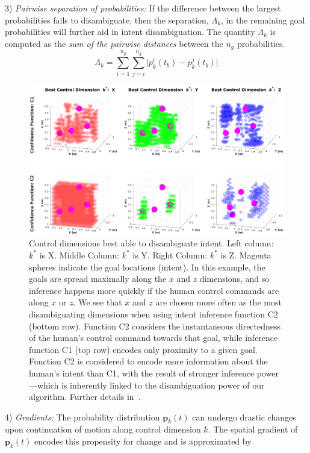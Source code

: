 3) \textit{Pairwise separation of probabilities:} If the difference between the largest probabilities fails to disambiguate, then the separation, $\Lambda_k$, in the remaining goal probabilities will further aid in intent disambiguation. The quantity $\Lambda_k$ is computed as the \textit{sum of the pairwise distances} between the $n_g$ probabilities.
\begin{equation}
\Lambda_k = \sum_{i=1}^{n_g}\sum_{j=i}^{n_g}\lvert p^i_k(t_b) - p^j_k(t_b)\rvert
\end{equation}
\begin{figure}[t]
	\centering
	\includegraphics[width = 1.15\hsize, height = 0.45\vsize, center]{./finalfigures/Fig4.eps}
	\caption{Control dimensions best able to disambiguate intent.  Left column: $k^*$ is X. Middle Column: $k^*$ is Y. Right Column: $k^*$ is Z. Magenta spheres indicate the goal locations (intent). In this example, the goals are spread maximally along the $x$ and $z$ dimensions, and so inference happens more quickly if the human control commands are along $x$ or $z$. We see that $x$ and $z$ are chosen more often as the most disambiguating dimensions when using intent inference function C2 (bottom row). Function C2 considers the instantaneous directedness of the human's control command towards that goal, while inference function C1 (top row) encodes only proximity to a given goal. Function C2 is considered to encode more information about the human's intent than C1, with the result of stronger inference power---which is inherently linked to the disambiguation power of our algorithm. Further details in~\cite{gopinath2017mode}.}
	\label{fig:sim_res}
\end{figure}
4) \textit{Gradients:} The probability distribution $\boldsymbol{p}_k(t)$ can undergo drastic changes upon continuation of motion along control dimension $k$. The spatial gradient of $\boldsymbol{p}_k(t)$ encodes this propensity for change and is approximated by 
